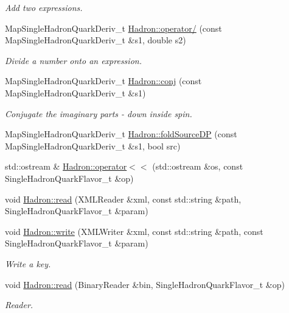 \begin{DoxyCompactItemize}
\begin{DoxyCompactList}\small\item\em Add two expressions. \end{DoxyCompactList}\item 
Map\+Single\+Hadron\+Quark\+Deriv\+\_\+t \mbox{\hyperlink{namespaceHadron_aee22779796ebd9e7ee8772c1eb965b6c}{Hadron\+::operator/}} (const Map\+Single\+Hadron\+Quark\+Deriv\+\_\+t \&s1, double s2)
\begin{DoxyCompactList}\small\item\em Divide a number onto an expression. \end{DoxyCompactList}\item 
Map\+Single\+Hadron\+Quark\+Deriv\+\_\+t \mbox{\hyperlink{namespaceHadron_a218b77b239d871def6267d4b34bdf7c1}{Hadron\+::conj}} (const Map\+Single\+Hadron\+Quark\+Deriv\+\_\+t \&s1)
\begin{DoxyCompactList}\small\item\em Conjugate the imaginary parts -\/ down inside spin. \end{DoxyCompactList}\item 
Map\+Single\+Hadron\+Quark\+Deriv\+\_\+t \mbox{\hyperlink{namespaceHadron_af80d375e34002f168b53c74370f8dd3a}{Hadron\+::fold\+Source\+DP}} (const Map\+Single\+Hadron\+Quark\+Deriv\+\_\+t \&s1, bool src)
\item 
std\+::ostream \& \mbox{\hyperlink{namespaceHadron_a7b979b64d9a0ab8025031a090f9494c0}{Hadron\+::operator$<$$<$}} (std\+::ostream \&os, const Single\+Hadron\+Quark\+Flavor\+\_\+t \&op)
\item 
void \mbox{\hyperlink{namespaceHadron_af2bd5c5dd10efe01fefda4ec1c5ce04d}{Hadron\+::read}} (X\+M\+L\+Reader \&xml, const std\+::string \&path, Single\+Hadron\+Quark\+Flavor\+\_\+t \&param)
\item 
void \mbox{\hyperlink{namespaceHadron_aa1f03b8b2d78349da848f9a9bcf19e33}{Hadron\+::write}} (X\+M\+L\+Writer \&xml, const std\+::string \&path, const Single\+Hadron\+Quark\+Flavor\+\_\+t \&param)
\begin{DoxyCompactList}\small\item\em Write a key. \end{DoxyCompactList}\item 
void \mbox{\hyperlink{namespaceHadron_ae80a1bcfb7767fb7993d4a439d6493ba}{Hadron\+::read}} (Binary\+Reader \&bin, Single\+Hadron\+Quark\+Flavor\+\_\+t \&op)
\begin{DoxyCompactList}\small\item\em Reader. \end{DoxyCompactList}\item 

\end{DoxyCompactItemize}
